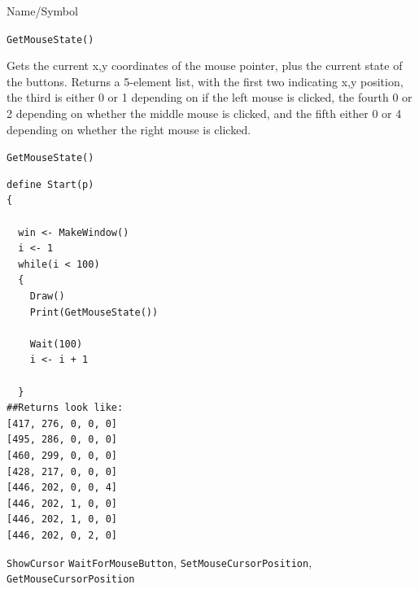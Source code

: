 \begin{desc}{Name/Symbol}
\item[Name/Symbol] \verb+GetMouseState()+

\item[Description] Gets the current x,y coordinates of the mouse
  pointer, plus the current state of the buttons.  Returns a 5-element list, with the first two indicating x,y position, the third is either 0 or 1 depending on if the left mouse is clicked, the fourth 0 or 2 depending on whether the middle mouse is clicked, and the fifth either 0 or 4 depending on whether the right mouse is clicked.

\item[Usage]
\verb+GetMouseState()+

\item[Example]	

\begin{verbatim}
define Start(p)
{
 
  win <- MakeWindow()
  i <- 1
  while(i < 100)
  {
    Draw()
    Print(GetMouseState())

    Wait(100)
    i <- i + 1

  }	
##Returns look like:
[417, 276, 0, 0, 0]
[495, 286, 0, 0, 0]
[460, 299, 0, 0, 0]
[428, 217, 0, 0, 0]
[446, 202, 0, 0, 4]
[446, 202, 1, 0, 0]
[446, 202, 1, 0, 0]
[446, 202, 0, 2, 0]

\end{verbatim}

\item[See Also]
  \verb+ShowCursor+ \verb+WaitForMouseButton+,
  \verb+SetMouseCursorPosition+, \verb+GetMouseCursorPosition+
\end{desc}




